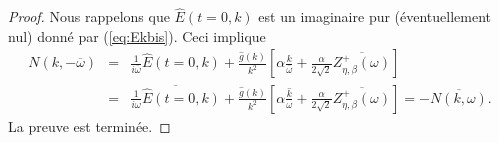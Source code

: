 \begin{proof}
  Nous rappelons que $\hat{E}(t=0,k)$ est un imaginaire pur (éventuellement nul) donné par (\ref{eq:Ekbis}). Ceci implique
  \begin{eqnarray*}
    N(k,-\overline{\omega})&=&\frac{1}{i\overline{\omega}}\hat{E}(t=0,k)+\frac{\hat{g}(k)}{ k^2}\left[\alpha\frac{k}{\overline{\omega}}+\frac{\alpha}{2\sqrt{2}}\overline{Z_{\eta,\beta}^+\left(\omega\right)}\right]\\
    &=&\overline{\frac{1}{i\omega}\hat{E}(t=0,k)}+\frac{\hat{g}(k)}{ k^2}\left[\alpha\overline{\frac{k}{\omega}}+\frac{\alpha}{2\sqrt{2}}\overline{Z_{\eta,\beta}^+\left(\omega\right)}\right]=-\overline{N(k,\omega)}.
  \end{eqnarray*}
  La preuve est terminée.
\end{proof}
